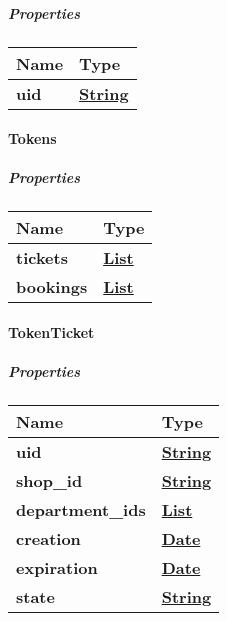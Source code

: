 \hypertarget{properties-12}{%
\subparagraph{Properties}\label{properties-12}}

\begin{longtable}[]{@{}ll@{}}
\toprule
Name & Type\tabularnewline
\midrule
\endhead
\textbf{uid} & \href{string.md}{\textbf{String}}\tabularnewline
\bottomrule
\end{longtable}

\hypertarget{tokens}{%
\paragraph{Tokens}\label{tokens}}

\hypertarget{properties-13}{%
\subparagraph{Properties}\label{properties-13}}

\begin{longtable}[]{@{}ll@{}}
\toprule
Name & Type\tabularnewline
\midrule
\endhead
\textbf{tickets} & \href{TokenTicket.md}{\textbf{List}}\tabularnewline
\textbf{bookings} & \href{TokenBooking.md}{\textbf{List}}\tabularnewline
\bottomrule
\end{longtable}

\hypertarget{tokenticket}{%
\paragraph{TokenTicket}\label{tokenticket}}

\hypertarget{properties-14}{%
\subparagraph{Properties}\label{properties-14}}

\begin{longtable}[]{@{}ll@{}}
\toprule
Name & Type\tabularnewline
\midrule
\endhead
\textbf{uid} & \href{string.md}{\textbf{String}}\tabularnewline
\textbf{shop\_id} & \href{string.md}{\textbf{String}}\tabularnewline
\textbf{department\_ids} &
\href{string.md}{\textbf{List}}\tabularnewline
\textbf{creation} & \href{DateTime.md}{\textbf{Date}}\tabularnewline
\textbf{expiration} & \href{DateTime.md}{\textbf{Date}}\tabularnewline
\textbf{state} & \href{string.md}{\textbf{String}}\tabularnewline
\bottomrule
\end{longtable}

